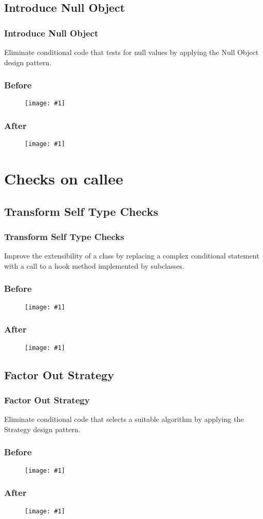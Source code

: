 \documentclass{beamer}
\newcommand{\putimage}[2] {
  \begin{figure}[H]
    \centering
    \texttt{[image: \#1]}
	\end{figure}
}
\begin{document}
\subsection{Introduce Null Object}
\begin{frame}
\frametitle{Introduce Null Object}
\huge Eliminate conditional code that tests for null values by applying the Null Object design pattern.
\end{frame}
\begin{frame}
\frametitle{Before}
  \putimage{images/introduce-null-object/before.png}{0.99}
\end{frame}
\begin{frame}
\frametitle{After}
  \putimage{images/introduce-null-object/after.png}{0.99}
\end{frame}

\section{Checks on callee}

\subsection{Transform Self Type Checks}
\begin{frame}
\frametitle{Transform Self Type Checks}
\huge Improve the extensibility of a class by replacing a complex conditional statement with a call to a hook method implemented by subclasses.
\end{frame}
\begin{frame}
\frametitle{Before}
  \putimage{images/transform-self-type-checks/before.png}{0.99}
\end{frame}
\begin{frame}
\frametitle{After}
  \putimage{images/transform-self-type-checks/after.png}{0.70}
\end{frame}

\subsection{Factor Out Strategy}
\begin{frame}
\frametitle{Factor Out Strategy}
\huge Eliminate conditional code that selects a suitable algorithm by applying the Strategy design pattern.
\end{frame}
\begin{frame}
\frametitle{Before}
  \putimage{images/factor-out-strategy/before.png}{0.99}
\end{frame}
\begin{frame}
\frametitle{After}
  \putimage{images/factor-out-strategy/after.png}{0.99}
\end{frame}
 
\end{document}
